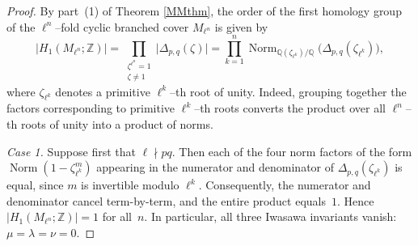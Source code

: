 \documentclass[table]{amsart}
\numberwithin{equation}{section}
\begin{document}
\begin{proof}
By part~(1) of Theorem \ref{MMthm}, the order of the first homology group of the
$\ell^n$--fold cyclic branched cover $M_{\ell^n}$ is given by
\[
\big|H_1(M_{\ell^n};\mathbb{Z})\big|
=\prod_{\substack{\zeta^{\ell^n}=1\\ \zeta\ne1}}
\big|\Delta_{p,q}(\zeta)\big|
=\prod_{k=1}^{n}
\operatorname{Norm}_{\mathbb{Q}(\zeta_{\ell^k})/\mathbb{Q}}
\big(\Delta_{p,q}(\zeta_{\ell^k})\big),
\]
where $\zeta_{\ell^k}$ denotes a primitive $\ell^k$--th root of unity. Indeed, grouping together the factors corresponding to primitive
$\ell^k$--th roots converts the product over all $\ell^n$--th roots of unity
into a product of norms.

\vspace{0.5em}
\noindent
\emph{Case 1.} Suppose first that $\ell\nmid pq$.
Then each of the four norm factors of the form
$\operatorname{Norm}(1-\zeta_{\ell^k}^m)$
appearing in the numerator and denominator of
$\Delta_{p,q}(\zeta_{\ell^k})$
is equal, since $m$ is invertible modulo $\ell^k$.
Consequently, the numerator and denominator cancel term-by-term, and the
entire product equals~$1$.
Hence $|H_1(M_{\ell^n};\mathbb{Z})|=1$ for all~$n$.
In particular, all three Iwasawa invariants vanish:
$\mu=\lambda=\nu=0$.


\end{proof}
\end{document}
